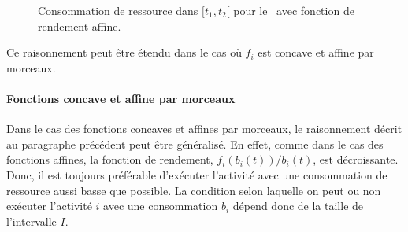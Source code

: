 \begin{ex}
\begin{figure}[!htb]
{
}
  \caption{Consommation de ressource dans $[t_1,t_2[$ pour le
    \CECSP~avec fonction de rendement affine.}
\label{fig:ex_Lin}
\end{figure}
\end{ex}

Ce raisonnement peut être étendu dans le cas où $f_i$ est concave et
affine par morceaux. 

\paragraph{Fonctions concave et affine par morceaux}

Dans le cas des fonctions concaves et affines par morceaux, le
raisonnement décrit au paragraphe précédent peut être généralisé. En
effet, comme dans le cas des fonctions affines, la fonction de
rendement, $f_i(b_i(t))/b_i(t)$, est décroissante. Donc, il est
toujours préférable d'exécuter l'activité avec une consommation de
ressource aussi basse que possible. La condition selon laquelle on
peut ou non exécuter l'activité $i$ avec une consommation $b_i$ dépend
donc de la taille de l'intervalle $I$. 


